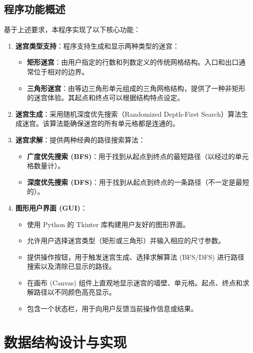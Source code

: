 \documentclass[UTF8]{report}
\theoremstyle{MyLineTheoremStyle} %
\theoremstyle{MyBlockTheoremStyle} %
\theoremstyle{MySubsubsectionStyle} %
\begin{document}
\subsection{程序功能概述}
基于上述要求，本程序实现了以下核心功能：
\begin{enumerate}
    \item \textbf{迷宫类型支持}：程序支持生成和显示两种类型的迷宫：
    \begin{itemize}
        \item \textbf{矩形迷宫}：由用户指定的行数和列数定义的传统网格结构。入口和出口通常位于相对的边界。
        \item \textbf{三角形迷宫}：由等边三角形单元组成的三角网格结构，提供了一种非矩形的迷宫体验。其起点和终点可以根据结构特点设定。
    \end{itemize}
    \item \textbf{迷宫生成}：采用随机深度优先搜索（Randomized Depth-First Search）算法生成迷宫。该算法能确保迷宫的所有单元格都是连通的。
    \item \textbf{迷宫求解}：提供两种经典的路径搜索算法：
    \begin{itemize}
        \item \textbf{广度优先搜索 (BFS)}：用于找到从起点到终点的最短路径（以经过的单元格数量计）。
        \item \textbf{深度优先搜索 (DFS)}：用于找到从起点到终点的一条路径（不一定是最短的）。
    \end{itemize}
    \item \textbf{图形用户界面 (GUI)}：
    \begin{itemize}
        \item 使用 Python 的 Tkinter 库构建用户友好的图形界面。
        \item 允许用户选择迷宫类型（矩形或三角形）并输入相应的尺寸参数。
        \item 提供操作按钮，用于触发迷宫生成、选择求解算法 (BFS/DFS) 进行路径搜索以及清除已显示的路径。
        \item 在画布 (Canvas) 组件上直观地显示迷宫的墙壁、单元格。起点、终点和求解路径以不同颜色高亮显示。
        \item 包含一个状态栏，用于向用户反馈当前操作信息或结果。
    \end{itemize}
\end{enumerate}

\section{数据结构设计与实现}
\end{document}
